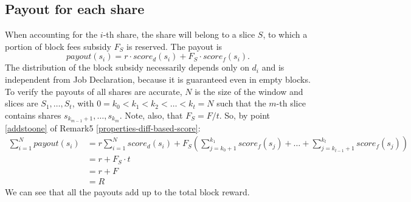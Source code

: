\documentclass[11pt]{article}
\begin{document}
\subsection{Payout for each share}
When accounting for the $i$-th share, the share will belong to a slice $S$, to which a portion of block fees subsidy $F_S$ is reserved. The payout is
\[payout(s_i) = r\cdot score_d(s_i) + F_S \cdot score_f(s_i).\]
The distribution of the block subsidy necessarily depends only on $d_i$ and is independent from Job Declaration, because it is guaranteed even in empty blocks.
To verify the payouts of all shares are accurate, $N$ is the size of the window and slices are $S_1, \dots, S_t$, with $0=k_0<k_1< k_2< \dots < k_t=N$ such that the $m$-th slice contains shares $s_{k_{m-1}+1}, \dots, s_{k_{m}}$. Note, also, that $F_S = F/t$. So, by point \ref{addstoone} of Remark5 \ref{properties-diff-based-score}:
\begin{align*}
	\sum_{i=1} ^N payout(s_i) & = r\sum_{i=1}^N score_d(s_i) +F_{S}\left(\sum_{j=k_0+1}^{k_1} score_f(s_j)+\dots +\sum_{j=k_{t-1}+1}^{k_t} score_f(s_j)\right) \\
	                          & = r +F_S\cdot t                                                                                                                \\ &= r+F \\ &= R
\end{align*}
We can see that all the payouts add up to the total block reward.
\end{document}
